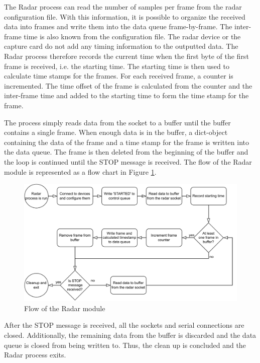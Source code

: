 The Radar process can read the number of samples per frame from the radar configuration file.
With this information, it is possible to organize the received data into frames and write them into the data queue frame-by-frame.
The inter-frame time is also known from the configuration file.
The radar device or the capture card do not add any timing information to the outputted data.
The Radar process therefore records the current time when the first byte of the first frame is received, i.e. the starting time.
The starting time is then used to calculate time stamps for the frames.
For each received frame, a counter is incremented. The time offset of the frame is calculated from the counter and the inter-frame time and added to the starting time
to form the time stamp for the frame.

The process simply reads data from the socket to a buffer until the buffer contains a single frame.
When enough data is in the buffer, a dict-object containing the data of the frame and a time stamp for the frame is written into the data queue.
The frame is then deleted from the beginning of the buffer and the loop is continued until the STOP message is received.
The flow of the Radar module is represented as a flow chart in Figure \ref{fig:3-radar-flowchart}.

\begin{figure}[H]
    \centering
    \includegraphics[width=\textwidth]{fig/3/radar-flowchart.pdf}
    \caption{Flow of the Radar module}
    \label{fig:3-radar-flowchart}
\end{figure}

After the STOP message is received,
all the sockets and serial connections are closed.
Additionally, the remaining data from the buffer is discarded and the data queue is closed from being written to.
Thus, the clean up is concluded and the Radar process exits.

